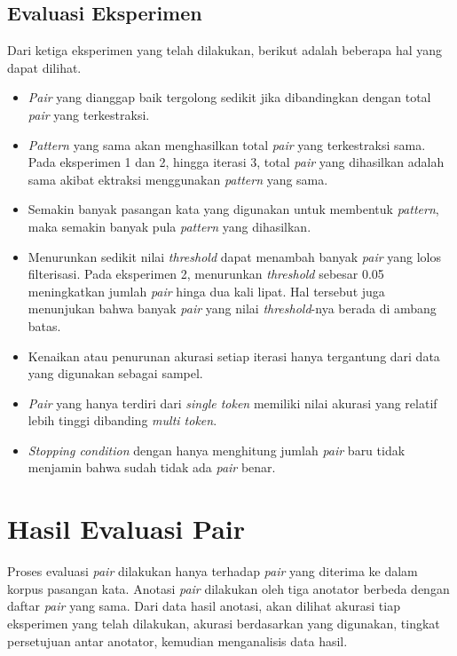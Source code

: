 \subsection{Evaluasi Eksperimen}
Dari ketiga eksperimen yang telah dilakukan, berikut adalah beberapa hal yang dapat dilihat.
\begin{itemize}
  \item \textit{Pair} yang dianggap baik tergolong sedikit jika dibandingkan dengan total \textit{pair} yang terkestraksi.
  \item \textit{Pattern} yang sama akan menghasilkan total \textit{pair} yang terkestraksi sama. Pada eksperimen 1 dan 2, hingga iterasi 3, total \textit{pair} yang dihasilkan adalah sama akibat ektraksi menggunakan \textit{pattern} yang sama.
  \item Semakin banyak pasangan kata yang digunakan untuk membentuk \textit{pattern}, maka semakin banyak pula \textit{pattern} yang dihasilkan.
  \item Menurunkan sedikit nilai \textit{threshold} dapat menambah banyak \textit{pair} yang lolos filterisasi. Pada eksperimen 2, menurunkan \textit{threshold} sebesar 0.05 meningkatkan jumlah \textit{pair} hinga dua kali lipat. Hal tersebut juga menunjukan bahwa banyak \textit{pair} yang nilai \textit{threshold}-nya berada di ambang batas. 
  \item Kenaikan atau penurunan akurasi setiap iterasi hanya tergantung dari data yang digunakan sebagai sampel. 
  \item \textit{Pair} yang hanya terdiri dari \textit{single token} memiliki nilai akurasi yang relatif lebih tinggi dibanding \textit{multi token}.
  \item \textit{Stopping condition} dengan hanya menghitung jumlah \textit{pair} baru tidak menjamin bahwa sudah tidak ada \textit{pair} benar.   
\end{itemize}

\section{Hasil Evaluasi Pair}
Proses evaluasi \textit{pair} dilakukan hanya terhadap \textit{pair} yang diterima ke dalam korpus pasangan kata. Anotasi \textit{pair} dilakukan oleh tiga anotator berbeda dengan daftar \textit{pair} yang sama. Dari data hasil anotasi, akan dilihat akurasi tiap eksperimen yang telah dilakukan, akurasi berdasarkan  yang digunakan, tingkat persetujuan antar anotator, kemudian menganalisis data hasil.

